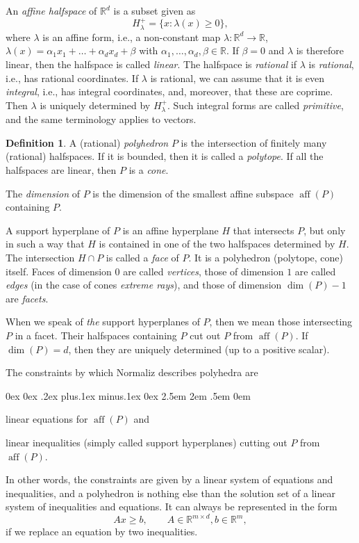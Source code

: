\documentclass[12pt,a4paper]{scrartcl}
\newcounter{listi}
\newcommand{\stdli}{ \topsep0ex \partopsep0ex %
\parsep.2ex plus.1ex minus.1ex \itemsep0ex%
\leftmargin2.5em \labelwidth2em \labelsep.5em \rightmargin0em}%
\newenvironment{arab}{\begin{list}{\textup{(\arabic{listi})}}%
	{\usecounter{listi}\stdli}}{\end{list}}
\theoremstyle{definition}
\newtheorem{definition}[theorem]{Definition}
\def\RR{{\mathbb R}}
\DeclareMathOperator{\aff}{aff}
\begin{document}
An \emph{affine halfspace} of $\RR^d$ is a subset given as
$$
H_\lambda^+=\{x: \lambda(x)\ge 0\},
$$
where $\lambda$ is an affine form, i.e., a non-constant map $\lambda:\RR^d\to\RR$, $\lambda(x)=\alpha_1x_1+\dots+\alpha_dx_d+\beta$ with $\alpha_1,\dots,\alpha_d,\beta\in\RR$. If $\beta=0$ and $\lambda$ is therefore linear, then the halfspace is called \emph{linear}. The halfspace is \emph{rational} if $\lambda$ is \emph{rational},  i.e., has rational coordinates. If $\lambda$ is rational, we can assume that it is even \emph{integral}, i.e., has integral coordinates, and, moreover, that these are coprime. Then $\lambda$ is uniquely determined by $H_\lambda^+$. Such integral  forms are called \emph{primitive}, and the same terminology applies to vectors.

\begin{definition}
	A (rational) \emph{polyhedron} $P$ is the intersection of finitely many (rational) halfspaces. If it is bounded, then it is called a \emph{polytope}. If all the halfspaces are linear, then $P$ is a \emph{cone}.
	
	The \emph{dimension} of $P$ is the dimension of the smallest affine subspace $\aff(P)$ containing $P$.
\end{definition}


A support hyperplane of $P$ is an affine hyperplane $H$ that intersects $P$, but only in such a way that $H$ is contained in one of the two halfspaces determined by $H$. The intersection $H\cap P$ is called a \emph{face} of $P$. It is a polyhedron (polytope, cone) itself. Faces of dimension $0$ are called \emph{vertices}, those of dimension $1$ are called \emph{edges} (in the case of cones \emph{extreme rays}), and those of dimension $\dim(P)-1$ are \emph{facets}.

When we speak of \emph{the} support hyperplanes of $P$, then we mean those intersecting $P$ in a facet. Their halfspaces containing $P$ cut out $P$ from $\aff(P)$. If $\dim(P)=d$, then they are uniquely determined (up to a positive scalar).

The constraints by which Normaliz describes polyhedra are
\begin{arab}
	\item linear equations for $\aff(P)$ and
	\item linear inequalities (simply called support hyperplanes) cutting out $P$ from $\aff(P)$.
\end{arab}
In other words, the constraints are given by a linear system of equations and inequalities, and a polyhedron is nothing else than the solution set of a linear system of inequalities and equations. It can always be represented in the form
$$
Ax\ge b, \qquad A\in\RR^{m\times d}, b\in \RR^m,
$$
if we replace an equation by two inequalities.
\end{document}
